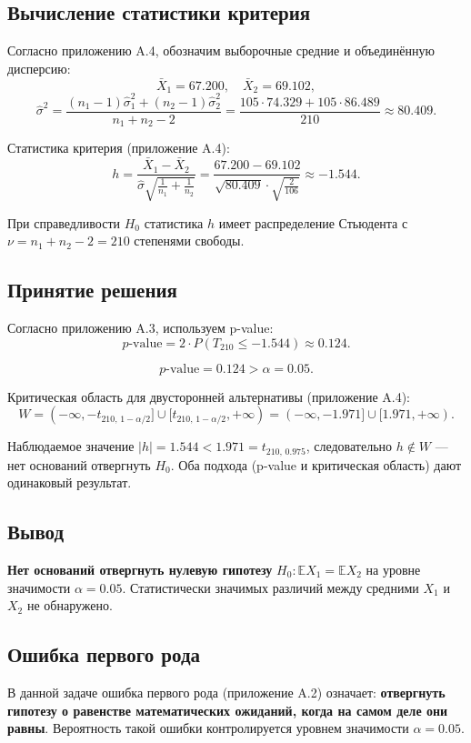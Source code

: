 \subsection{Вычисление статистики критерия}

Согласно приложению A.4, обозначим выборочные средние и объединённую дисперсию:
\[
\bar{X}_1 = 67.200, \quad \bar{X}_2 = 69.102,
\]
\[
\hat{\sigma}^2 = \frac{(n_1 - 1)\hat{\sigma}_1^2 + (n_2 - 1)\hat{\sigma}_2^2}{n_1 + n_2 - 2}
= \frac{105 \cdot 74.329 + 105 \cdot 86.489}{210}
\approx 80.409.
\]

Статистика критерия (приложение A.4):
\[
h = \frac{\bar{X}_1 - \bar{X}_2}{\hat{\sigma} \sqrt{\frac{1}{n_1} + \frac{1}{n_2}}}
= \frac{67.200 - 69.102}{\sqrt{80.409} \cdot \sqrt{\frac{2}{106}}}
\approx -1.544.
\]

При справедливости \(H_0\) статистика \(h\) имеет распределение Стьюдента с \(\nu = n_1 + n_2 - 2 = 210\) степенями свободы.

\subsection{Принятие решения}

Согласно приложению A.3, используем p-value:
\[
p\text{-value} = 2 \cdot P(T_{210} \leq -1.544) \approx 0.124.
\]

\[
p\text{-value} = 0.124 > \alpha = 0.05.
\]

Критическая область для двусторонней альтернативы (приложение A.4):
\[
W = (-\infty, -t_{210,\, 1-\alpha/2}] \cup [t_{210,\, 1-\alpha/2}, +\infty)
= (-\infty, -1.971] \cup [1.971, +\infty).
\]

Наблюдаемое значение \(|h| = 1.544 < 1.971 = t_{210,\, 0.975}\), следовательно \(h \notin W\) — нет оснований отвергнуть \(H_0\). Оба подхода (p-value и критическая область) дают одинаковый результат.

\subsection{Вывод}

\textbf{Нет оснований отвергнуть нулевую гипотезу} \(H_0: \mathbb{E}X_1 = \mathbb{E}X_2\) на уровне значимости \(\alpha = 0.05\). Статистически значимых различий между средними \(X_1\) и \(X_2\) не обнаружено.

\subsection{Ошибка первого рода}

В данной задаче ошибка первого рода (приложение A.2) означает: \textbf{отвергнуть гипотезу о равенстве математических ожиданий, когда на самом деле они равны}. Вероятность такой ошибки контролируется уровнем значимости \(\alpha = 0.05\).
